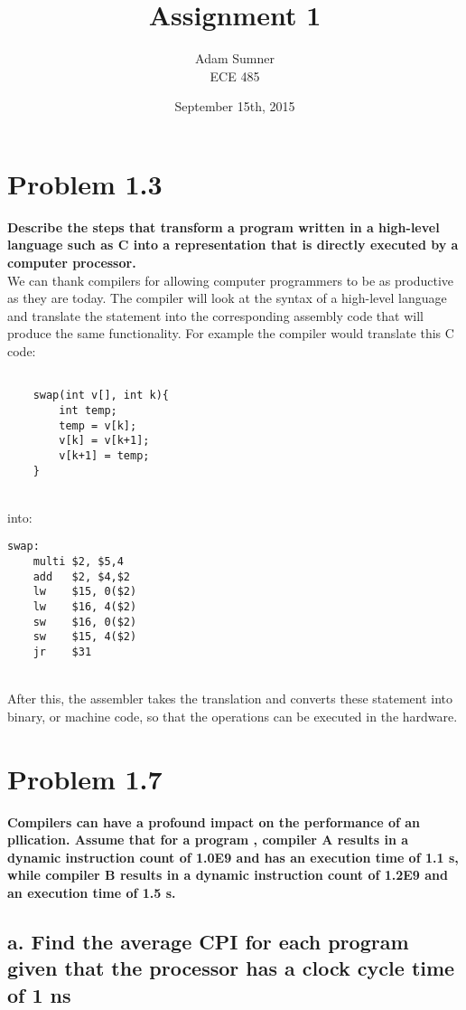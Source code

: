 \documentclass[11pt]{article}
\title{\textbf{Assignment 1}}
\author{Adam Sumner\\ECE 485}
\date{September 15th, 2015}
\begin{document}
\maketitle

\section*{Problem 1.3}

\small\textbf{Describe the steps that transform a program written in a high-level language such as C into a representation that is directly executed by a computer processor.}\\

We can thank compilers for allowing computer programmers to be as productive as they are today. The compiler will look at the syntax of a high-level language and translate the statement into the corresponding assembly code that will produce the same functionality. For example the compiler would translate this C code: \\ 

\begin{lstlisting}[style = customc]

	swap(int v[], int k){
	    int temp;
	    temp = v[k];
	    v[k] = v[k+1];
	    v[k+1] = temp;
	}
\end{lstlisting}
~\\
into:

\begin{lstlisting}[style=customasm]
swap:
    multi $2, $5,4
    add   $2, $4,$2
    lw    $15, 0($2)
    lw    $16, 4($2)
    sw    $16, 0($2)
    sw    $15, 4($2)
    jr    $31
\end{lstlisting}
~\\

After this, the assembler takes the translation and converts these statement into binary, or machine code, so that the operations can be executed in the hardware.

\section*{Problem 1.7}
\small\textbf{Compilers can have a profound impact on the performance of an pllication. Assume that for a program , compiler A results in a dynamic instruction count of 1.0E9 and has an execution time of 1.1 s, while compiler B results in a dynamic instruction count of 1.2E9 and an execution time of 1.5 s.}
\subsection*{\small a. Find the average CPI for each program given that the processor has a clock cycle time of 1 ns}
\end{document}
